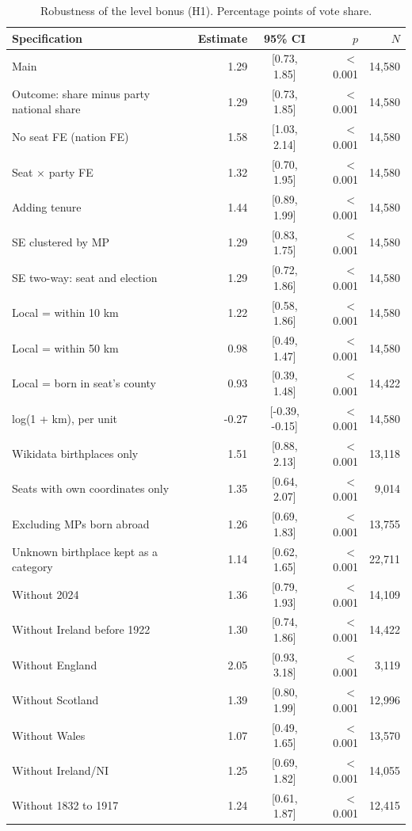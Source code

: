 \documentclass[11pt,a4paper]{article}
\begin{document}
\begin{table}[tbp]\centering\small\caption{Robustness of the level bonus (H1). Percentage points of vote share.}\label{tab:rob}
\begin{tabular}{p{7.4cm}rcrr}\toprule Specification & Estimate & 95\% CI & $p$ & $N$\\\midrule
Main & 1.29 & [0.73, 1.85] & $<$0.001 & 14,580\\
Outcome: share minus party national share & 1.29 & [0.73, 1.85] & $<$0.001 & 14,580\\
No seat FE (nation FE) & 1.58 & [1.03, 2.14] & $<$0.001 & 14,580\\
Seat $\times$ party FE & 1.32 & [0.70, 1.95] & $<$0.001 & 14,580\\
Adding tenure & 1.44 & [0.89, 1.99] & $<$0.001 & 14,580\\
SE clustered by MP & 1.29 & [0.83, 1.75] & $<$0.001 & 14,580\\
SE two-way: seat and election & 1.29 & [0.72, 1.86] & $<$0.001 & 14,580\\
Local = within 10 km & 1.22 & [0.58, 1.86] & $<$0.001 & 14,580\\
Local = within 50 km & 0.98 & [0.49, 1.47] & $<$0.001 & 14,580\\
Local = born in seat's county & 0.93 & [0.39, 1.48] & $<$0.001 & 14,422\\
log(1 + km), per unit & -0.27 & [-0.39, -0.15] & $<$0.001 & 14,580\\
Wikidata birthplaces only & 1.51 & [0.88, 2.13] & $<$0.001 & 13,118\\
Seats with own coordinates only & 1.35 & [0.64, 2.07] & $<$0.001 & 9,014\\
Excluding MPs born abroad & 1.26 & [0.69, 1.83] & $<$0.001 & 13,755\\
Unknown birthplace kept as a category & 1.14 & [0.62, 1.65] & $<$0.001 & 22,711\\
Without 2024 & 1.36 & [0.79, 1.93] & $<$0.001 & 14,109\\
Without Ireland before 1922 & 1.30 & [0.74, 1.86] & $<$0.001 & 14,422\\
Without England & 2.05 & [0.93, 3.18] & $<$0.001 & 3,119\\
Without Scotland & 1.39 & [0.80, 1.99] & $<$0.001 & 12,996\\
Without Wales & 1.07 & [0.49, 1.65] & $<$0.001 & 13,570\\
Without Ireland/NI & 1.25 & [0.69, 1.82] & $<$0.001 & 14,055\\
Without 1832 to 1917 & 1.24 & [0.61, 1.87] & $<$0.001 & 12,415\\

\end{tabular}
\end{table}
\end{document}
